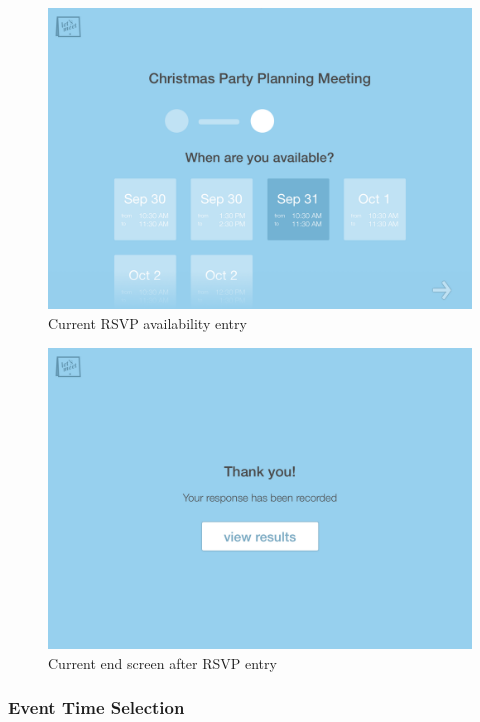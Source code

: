 \documentclass{sigchi}
\begin{document}
\begin{figure}
  \centering
  \includegraphics[width=1.75\columnwidth]{Mockup/RSVPEnterAvailability}
  \caption{Current RSVP availability entry}
\end{figure}

\begin{figure}
  \centering
  \includegraphics[width=1.75\columnwidth]{Mockup/RSVPResponse}
  \caption{Current end screen after RSVP entry}
\end{figure}
\FloatBarrier

\subsubsection{Event Time Selection}
\end{document}
